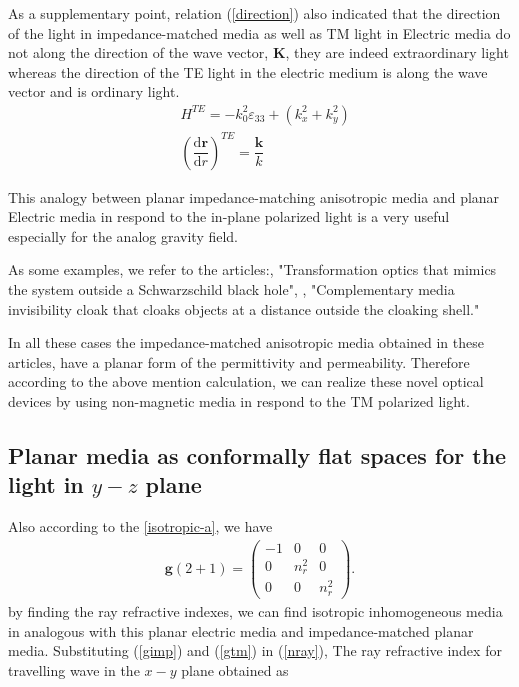 \documentclass[9pt,twocolumn,twoside]{osajnl}
\begin{document}
As a supplementary point, relation (\ref{direction}) also indicated that the direction of the light in impedance-matched media as well as TM light in Electric media do not along the direction of the wave vector, $\mathbf{K}$, they are indeed extraordinary light whereas the direction of the TE light in the electric medium is along the wave vector and is ordinary light.
\begin{eqnarray}
&H^{TE}=-k^{2}_{0} \varepsilon_{33}+(k_{x}^{2}+k_{y}^{2})\\
&\left(\dfrac{\mathrm{d}\mathbf{r}}{\mathrm{d}r}\right)^{TE}=\dfrac{\mathbf{k}}{k}
\end{eqnarray}

This analogy between planar impedance-matching anisotropic media and planar Electric media in respond to the in-plane polarized light is a very useful especially for the analog gravity field.

As some examples, we refer to the articles:\cite{chen2010transformation}, "Transformation optics that mimics the system outside a Schwarzschild black hole", \cite{lai2009complementary}, "Complementary media invisibility cloak that cloaks objects at a distance outside the cloaking shell."

In all these cases the impedance-matched anisotropic media obtained in these articles, have a planar form of the permittivity and permeability. Therefore according to the above mention calculation, we can realize these novel optical devices by using non-magnetic media in respond to the TM polarized light.

\subsection{Planar media as conformally flat spaces for the light in $y-z$ plane}
Also according to the \ref{isotropic-a}, we have
\begin{align}
\mathbf{g}(2+1)=
\begin{pmatrix}
-1&0&0\\
0&n_{r}^{2}& 0\\
0&0&n_{r}^{2}
\end{pmatrix}.
\end{align}
by finding the ray refractive indexes, we can find  isotropic inhomogeneous media in analogous with this planar electric media and impedance-matched planar media.
Substituting (\ref{gimp}) and (\ref{gtm}) in (\ref{nray}), The ray refractive index for travelling wave in the $x-y$ plane obtained as
\end{document}
